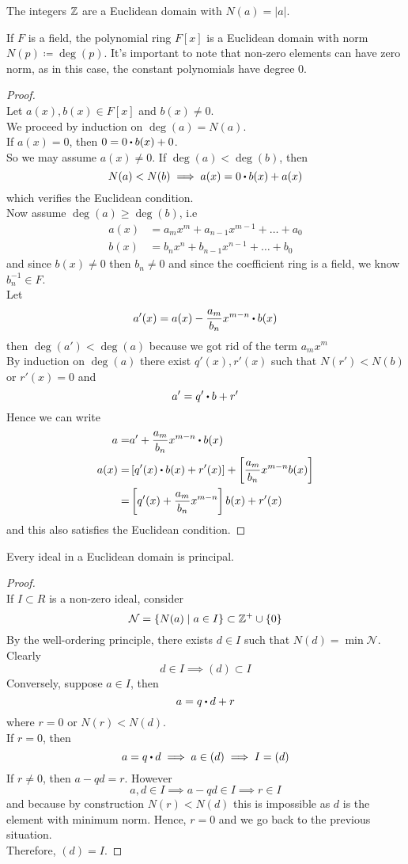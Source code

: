 \documentclass[../Main.tex]{subfiles}
\begin{document}
\begin{example}
	The integers $\mathbb{Z}$ are a Euclidean domain with $N(a)=|a|$.
\end{example}
\begin{example}
	If $F$ is a field, the polynomial ring $F[x]$ is a Euclidean domain with norm $N(p)\coloneqq \deg(p)$. It's important to note that non-zero elements can have zero norm, as in this case, the constant polynomials have degree $0$.
\end{example}
\begin{proof}~\\
	Let $a(x),b(x)\in F[x]$ and $b(x)\ne 0$.\\
	We proceed by induction on $\deg(a)=N(a)$.\\
	If $a(x)=0$, then $0=0\rdot b(x)+0$.\\
	So we may assume $a(x)\ne 0$. If $\deg(a)<\deg(b)$, then 
	\[N(a)<N(b)\implies a(x)=0\rdot b(x)+a(x)\]
	which verifies the Euclidean condition.\\
	Now assume $\deg(a)\ge \deg(b)$, i.e
	\begin{align*}
	a(x)&= a_mx^m+a_{n-1}x^{m-1}+\dots+a_0\\
	b(x)&= b_nx^n+b_{n-1}x^{n-1}+\dots+b_0
	\end{align*}
	and since $b(x)\ne 0$ then $b_n\ne 0$ and since the coefficient ring is a field, we know $b_n^{-1} \in F$.\\
	Let 
	\[a'(x)=a(x)-\frac{a_m}{b_n}x^{m-n}\rdot b(x)\]
	then $\deg(a')<\deg(a)$ because we got rid of the term $a_mx^m$\\
	By induction on $\deg(a)$ there exist $q'(x), r'(x)$ such that $N(r')<N(b)$ or $r'(x)=0$ and
	\[a'=q'\rdot b+r'\]
	Hence we can write
	\begin{align*}
	a=&a'+\frac{a_m}{b_n}x^{m-n}\rdot b(x) \\
	a(x) =& \left[q'(x)\rdot b(x)+r'(x)\right]+\left[\frac{a_m}{b_n}x^{m-n}b(x)\right]\\
	=&\left[q'(x)+\frac{a_m}{b_n}x^{m-n}\right]b(x)+r'(x)
	\end{align*}
	and this also satisfies the Euclidean condition.
\end{proof}
\newpage
\begin{prop}
	Every ideal in a Euclidean domain is principal.
\end{prop}
\begin{proof}~\\
	If $I\subset R$ is a non-zero ideal, consider
	\[\mathcal{N} = \{N(a)\mid a\in I\} \subset \mathbb{Z}^+\cup \{0\}\]
	By the well-ordering principle, there exists $d\in I$ such that $N(d)=\min \mathcal{N}$. Clearly
	\[d\in I \implies (d)\subset I\]
	Conversely, suppose $a\in I$, then
	\[a=q\rdot d+r\]
	where $r=0$ or $N(r)<N(d)$.\\
	If $r=0$, then  
	\[a=q\rdot d \implies a\in (d)\implies I=(d)\]
	If $r\ne 0$, then $a-qd=r$. However
	\[a,d\in I\implies a-qd\in I \implies r\in I\]
	and because by construction $N(r)<N(d)$ this is impossible as $d$ is the element with minimum norm. Hence, $r=0$ and we go back to the previous situation.\\
	Therefore, $(d)=I$.
\end{proof}
\end{document}
